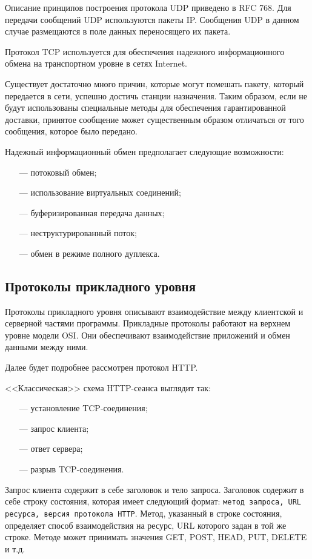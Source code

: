 Описание принципов построения протокола UDP приведено в RFC 768. Для передачи сообщений UDP используются пакеты IP. Сообщения UDP в данном случае размещаются в поле данных переносящего их пакета.

Протокол TCP используется для обеспечения надежного информаци­онного обмена на транспортном уровне в сетях Internet.

Существует достаточно много причин, которые могут помешать пакету, который передается в сети, успешно достичь станции назначения. Таким образом, если не будут использованы специальные методы для обеспечения гарантированной доставки, принятое сообщение может существенным образом отличаться от того сообщения, которое было передано.

Надежный информационный обмен предполагает следующие возмож­ности:
\begin{itemize}
	\item[---] потоковый обмен;
	\item[---] использование виртуальных соединений;
	\item[---] буферизированная передача данных;
	\item[---] неструктурированный поток;
	\item[---] обмен в режиме полного дуплекса.
\end{itemize}

\subsection{Протоколы прикладного уровня}

Протоколы прикладного уровня описывают взаимодействие между кли­ентской и серверной частями программы. Прикладные протоколы работают на верхнем уровне модели OSI. Они обеспечивают взаимодействие приложений и обмен данными между ними.

Далее будет подробнее рассмотрен протокол HTTP.

<<Классическая>> схема HTTP-сеанса выглядит так:

\begin{itemize}
	\item[---] установление TCP-соединения;
	\item[---] запрос клиента;
	\item[---] ответ сервера;
	\item[---] разрыв TCP-соединения.
\end{itemize}

Запрос клиента содержит в себе заголовок и тело запроса. Заголовок содержит в себе строку состояния, которая имеет следующий формат: \texttt{метод запроса, URL ресурса, версия протокола HTTP}. Метод, указанный в строке состояния, определяет способ взаимодействия на ресурс, URL которого задан в той же строке. Методе может принимать значения GET, POST, HEAD, PUT, DELETE и т.д. 

